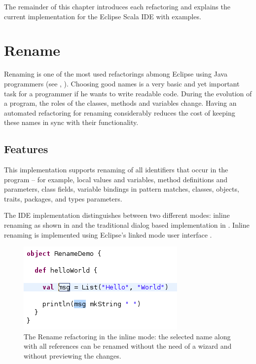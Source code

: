 \documentclass[10pt,a4paper,oneside]{scrreprt}
\begin{document}
The remainder of this chapter introduces each refactoring and explains the current implementation for the Eclipse Scala IDE with examples. 

\section{Rename}

Renaming is one of the most used refactorings abmong Eclipse using Java programmers (see \cite{RefactoringStudy}, \cite{RefactoringInEclipse}). Choosing good names is a very basic and yet important task for a programmer if he wants to write readable code. During the evolution of a program, the roles of the classes, methods and variables change. Having an automated refactoring for renaming considerably reduces the cost of keeping these names in sync with their functionality.

\subsection{Features}

This implementation supports renaming of all identifiers that occur in the program -- for example, local values and variables, method definitions and parameters, class fields, variable bindings in pattern matches, classes, objects, traits, packages, and types parameters.

The IDE implementation distinguishes between two different modes: inline renaming as shown in  and the traditional dialog based implementation in . Inline renaming is implemented using Eclipse's linked mode user interface \cite{LinkedUI}.

\begin{figure}
  \centering
  \includegraphics[width=0.5\linewidth]{rename_screenshot_1.png}
  \caption{The Rename refactoring in the inline mode: the selected name along with all references can be renamed without the need of a wizard and without previewing the changes.}
  \label{figure:rename-screenshot-1}
\end{figure}
\end{document}
